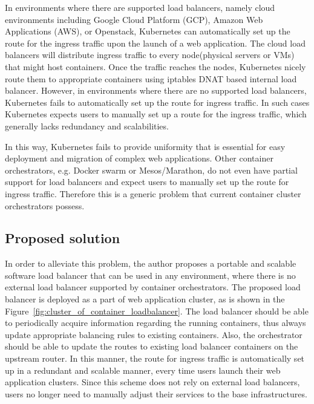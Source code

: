 In environments where there are supported load balancers, namely cloud environments including Google Cloud Platform (GCP), Amazon Web Applications (AWS), or Openstack, Kubernetes can automatically set up the route for the ingress traffic upon the launch of a web application.
The cloud load balancers will distribute ingress traffic to every node(physical servers or VMs) that might host containers.
Once the traffic reaches the nodes, Kubernetes nicely route them to appropriate containers using iptables DNAT based internal load balancer.
%
However, in environments where there are no supported load balancers, Kubernetes fails to automatically set up the route for ingress traffic.
In such cases Kubernetes expects users to manually set up a route for the ingress traffic, which generally lacks redundancy and scalabilities.

In this way, Kubernetes fails to provide uniformity that is essential for easy deployment and migration of complex web applications.
Other container orchestrators, e.g. Docker swarm or Mesos/Marathon, do not even have partial support for load balancers and expect users to manually set up the route for ingress traffic.
Therefore this is a generic problem that current container cluster orchestrators possess.

\subsection{Proposed solution}

In order to alleviate this problem, the author proposes a portable and scalable software load balancer that can be used in any environment, where there is no external load balancer supported by container orchestrators.
The proposed load balancer is deployed as a part of web application cluster, as is shown in the Figure~\ref{fig:cluster_of_container_loadbalancer}.
The load balancer should be able to periodically acquire information regarding the running containers, thus always update appropriate balancing rules to existing containers.
Also, the orchestrator should be able to update the routes to existing load balancer containers on the upstream router.
In this manner, the route for ingress traffic is automatically set up in a redundant and scalable manner, every time users launch their web application clusters.
Since this scheme does not rely on external load balancers, users no longer need to manually adjust their services to the base infrastructures.

